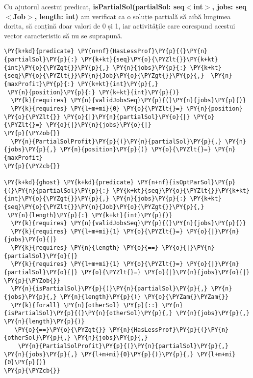 Cu ajutorul acestui predicat, \textbf{isPartialSol(partialSol: seq$<$int$>$, jobs: seq$<$Job$>$, length: int)} am verificat ca o soluție parțială să aibă lungimea dorita, să conțină doar valori de 0 și 1, iar activitățile care corespund acestui vector caracteristic să nu se suprapună.

\begin{Verbatim}[commandchars=\\\{\}, fontsize=\small]
\PY{k+kd}{predicate} \PY{n+nf}{HasLessProf}\PY{p}{(}\PY{n}{partialSol}\PY{p}{:} \PY{k+kt}{seq}\PY{o}{\PYZlt{}}\PY{k+kt}{int}\PY{o}{\PYZgt{}}\PY{p}{,} \PY{n}{jobs}\PY{p}{:} \PY{k+kt}{seq}\PY{o}{\PYZlt{}}\PY{n}{Job}\PY{o}{\PYZgt{}}\PY{p}{,}  \PY{n}{maxProfit}\PY{p}{:} \PY{k+kt}{int}\PY{p}{,}
 \PY{n}{position}\PY{p}{:} \PY{k+kt}{int}\PY{p}{)}
  \PY{k}{requires} \PY{n}{validJobsSeq}\PY{p}{(}\PY{n}{jobs}\PY{p}{)}
  \PY{k}{requires} \PY{l+m+mi}{0} \PY{o}{\PYZlt{}=} \PY{n}{position} \PY{o}{\PYZlt{}} \PY{o}{|}\PY{n}{partialSol}\PY{o}{|} \PY{o}{\PYZlt{}=} \PY{o}{|}\PY{n}{jobs}\PY{o}{|}
\PY{p}{\PYZob{}}
  \PY{n}{PartialSolProfit}\PY{p}{(}\PY{n}{partialSol}\PY{p}{,} \PY{n}{jobs}\PY{p}{,} \PY{n}{position}\PY{p}{)} \PY{o}{\PYZlt{}=} \PY{n}{maxProfit}
\PY{p}{\PYZcb{}}

\PY{k+kd}{ghost} \PY{k+kd}{predicate} \PY{n+nf}{isOptParSol}\PY{p}{(}\PY{n}{partialSol}\PY{p}{:} \PY{k+kt}{seq}\PY{o}{\PYZlt{}}\PY{k+kt}{int}\PY{o}{\PYZgt{}}\PY{p}{,} \PY{n}{jobs}\PY{p}{:} \PY{k+kt}{seq}\PY{o}{\PYZlt{}}\PY{n}{Job}\PY{o}{\PYZgt{}}\PY{p}{,}
 \PY{n}{length}\PY{p}{:} \PY{k+kt}{int}\PY{p}{)}
  \PY{k}{requires} \PY{n}{validJobsSeq}\PY{p}{(}\PY{n}{jobs}\PY{p}{)}
  \PY{k}{requires} \PY{l+m+mi}{1} \PY{o}{\PYZlt{}=} \PY{o}{|}\PY{n}{jobs}\PY{o}{|} 
  \PY{k}{requires} \PY{n}{length} \PY{o}{==} \PY{o}{|}\PY{n}{partialSol}\PY{o}{|}
  \PY{k}{requires} \PY{l+m+mi}{1} \PY{o}{\PYZlt{}=} \PY{o}{|}\PY{n}{partialSol}\PY{o}{|} \PY{o}{\PYZlt{}=} \PY{o}{|}\PY{n}{jobs}\PY{o}{|}
\PY{p}{\PYZob{}}
  \PY{n}{isPartialSol}\PY{p}{(}\PY{n}{partialSol}\PY{p}{,} \PY{n}{jobs}\PY{p}{,} \PY{n}{length}\PY{p}{)} \PY{o}{\PYZam{}\PYZam{}}
  \PY{k}{forall} \PY{n}{otherSol} \PY{p}{::} \PY{n}{isPartialSol}\PY{p}{(}\PY{n}{otherSol}\PY{p}{,} \PY{n}{jobs}\PY{p}{,} \PY{n}{length}\PY{p}{)}
   \PY{o}{==}\PY{o}{\PYZgt{}} \PY{n}{HasLessProf}\PY{p}{(}\PY{n}{otherSol}\PY{p}{,} \PY{n}{jobs}\PY{p}{,}
    \PY{n}{PartialSolProfit}\PY{p}{(}\PY{n}{partialSol}\PY{p}{,} \PY{n}{jobs}\PY{p}{,} \PY{l+m+mi}{0}\PY{p}{)}\PY{p}{,} \PY{l+m+mi}{0}\PY{p}{)}
\PY{p}{\PYZcb{}}
\end{Verbatim}



